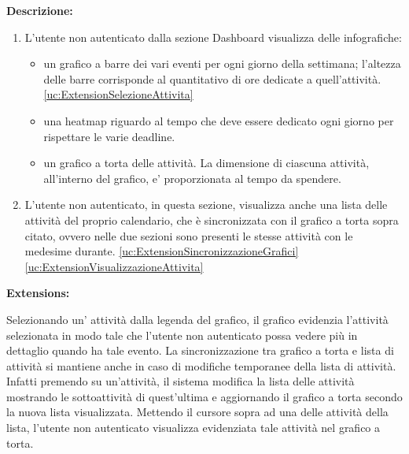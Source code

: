 \begin{listaPersonale}[UC]{}
    \textbf{Descrizione:}
    \begin{enumerate}
        \item L'utente non autenticato dalla sezione Dashboard visualizza delle infografiche:
              \begin{itemize}
                  \item un grafico a barre dei vari eventi per ogni giorno della settimana; l'altezza delle barre corrisponde al quantitativo di ore dedicate a quell'attività. \ref{uc:ExtensionSelezioneAttivita}
                  \item una heatmap riguardo al tempo che deve essere dedicato ogni giorno per rispettare le varie deadline.
                  \item un grafico a torta delle attività. La dimensione di ciascuna attività, all'interno del grafico, e' proporzionata al tempo da spendere.
              \end{itemize}
        \item L'utente non autenticato, in questa sezione, visualizza anche una lista delle attività del proprio calendario, che è sincronizzata con il grafico a torta sopra citato, ovvero nelle due sezioni sono presenti le stesse attività con le medesime durante. \ref{uc:ExtensionSincronizzazioneGrafici} \ref{uc:ExtensionVisualizzazioneAttivita}
    \end{enumerate}

    \textbf{Extensions:}
    \begin{enumerate}[label=\textbf{[extension \arabic{enumii}]}, ref= \textbf{[extension \arabic{enumii}]}]
         Selezionando un' attività dalla legenda del grafico, il grafico evidenzia l'attività selezionata in modo tale che l'utente non autenticato possa vedere più in dettaglio quando ha tale evento.
         La sincronizzazione tra grafico a torta e lista di attività si mantiene anche in caso di modifiche temporanee della lista di attività. Infatti premendo su un'attività, il sistema modifica la lista delle attività mostrando le sottoattività di quest'ultima e aggiornando il grafico a torta secondo la nuova lista visualizzata.
         Mettendo il cursore sopra ad una delle attività della lista, l'utente non autenticato visualizza evidenziata tale attività nel grafico a torta.
    \end{enumerate}




\end{listaPersonale}
